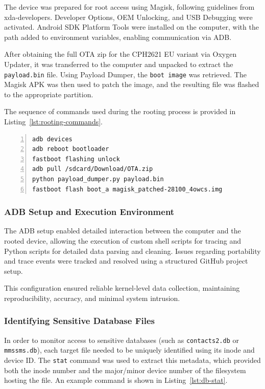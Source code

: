 \documentclass[a4paper,12pt]{report}
\begin{document}
The device was prepared for root access using Magisk, following guidelines from xda-developers. Developer Options, OEM Unlocking, and USB Debugging were activated. Android SDK Platform Tools were installed on the computer, with the path added to environment variables, enabling communication via ADB.

After obtaining the full OTA zip for the CPH2621 EU variant via Oxygen Updater, it was transferred to the computer and unpacked to extract the \texttt{payload.bin} file. Using Payload Dumper, the \texttt{boot image} was retrieved. The Magisk APK was then used to patch the image, and the resulting file was flashed to the appropriate partition.

The sequence of commands used during the rooting process is provided in Listing~\ref{lst:rooting-commands}.

\begin{lstlisting}[language=bash,caption={Rooting commands for device setup},label={lst:rooting-commands},numbers=left]
adb devices
adb reboot bootloader
fastboot flashing unlock
adb pull /sdcard/Download/OTA.zip
python payload_dumper.py payload.bin
fastboot flash boot_a magisk_patched-28100_4owcs.img
\end{lstlisting}

\subsubsection{ADB Setup and Execution Environment}

The ADB setup enabled detailed interaction between the computer and the rooted device, allowing the execution of custom shell scripts for tracing and Python scripts for detailed data parsing and cleaning. Issues regarding portability and trace events were tracked and resolved using a structured GitHub project setup.

This configuration ensured reliable kernel-level data collection, maintaining reproducibility, accuracy, and minimal system intrusion.

\subsubsection{Identifying Sensitive Database Files}

In order to monitor access to sensitive databases (such as \texttt{contacts2.db} or \texttt{mmssms.db}), each target file needed to be uniquely identified using its inode and device ID. The \texttt{stat} command was used to extract this metadata, which provided both the inode number and the major/minor device number of the filesystem hosting the file. An example command is shown in Listing~\ref{lst:db-stat}.
\end{document}
